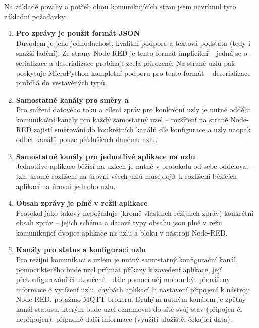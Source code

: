 Na základě povahy a potřeb obou komunikujících stran jsem navrhnul tyto základní požadavky:
\begin{enumerate}
    \item \textbf{Pro zprávy je použit formát JSON} \\
    Důvodem je jeho jednoduchost, kvalitní podpora a textová podstata (tedy i snažší ladění).
    Ze strany Node-RED je tento formát implicitní -- jedná se o  -- serializace a
    deserializace probíhají zcela přirozeně.
    Na straně uzlů pak poskytuje MicroPython kompletní podporu pro tento formát -- deserializace probíhá do
    vestavěných typů.

    \item \textbf{Samostatné kanály pro směry  a } \\
    Pro snížení datového toku a cílení zpráv pro konkrétní uzly je nutné oddělit komunikační kanály pro každý
    samostatný uzel -- rozšíření na straně Node-RED zajistí směřování do konkrétních kanálů dle konfigurace a uzly
    naopak odběr kanálů pouze příslušících danému uzlu.

    \item \textbf{Samostatné kanály pro jednotlivé aplikace na uzlu} \\
    Jednotlivé aplikace běžící na uzlech je nutné v protokolu od sebe oddělovat -- tzn. kromě rozlišení na úrovni
    všech uzlů musí dojít k rozlišení běžících aplikací na úrovni jednoho uzlu.

    \item \textbf{Obsah zprávy je plně v režii aplikace} \\
    Protokol jako takový nepožaduje (kromě vlastních režijních zpráv) konkrétní obsah zpráv -- jejich schéma a datové
    typy obsahu jsou plně v režii komunikující dvojice aplikace na uzlu a bloku v nástroji Node-RED.

    \item \textbf{Kanály pro status a konfiguraci uzlu} \\
    Pro režijní komunikaci s uzlem je nutný samostatný konfigurační kanál, pomocí kterého bude uzel příjmat příkazy k
    zavedení aplikace, její překonfigurování či ukončení -- dále pomocí něj mohou být přenášeny informace o vytížení
    uzlu, chybách aplikací či nastavení připojení k nástroji Node-RED, potažmo MQTT brokeru.
    Druhým nutným kanálem je zpětný kanál statusu, kterým bude uzel oznamovat do sítě svůj stav (připojen či
    nepřipojen), případně další informace (využití úložiště, čekající data).
\end{enumerate}

